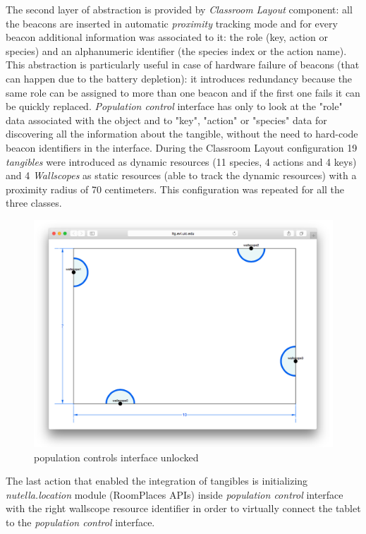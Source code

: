 The second layer of abstraction is provided by \textit{Classroom Layout} component: all the beacons are inserted in automatic \textit{proximity} tracking mode and for every beacon additional information was associated to it: the role (key, action or species) and an alphanumeric identifier (the species index or the action name). This abstraction is particularly useful in case of hardware failure of beacons (that can happen due to the battery depletion): it introduces redundancy because the same role can be assigned to more than one beacon and if the first one fails it can be quickly replaced. \textit{Population control} interface has only to look at the "role" data associated with the object and to "key", "action" or "species" data for discovering all the information about the tangible, without the need to hard-code beacon identifiers in the interface. During the Classroom Layout configuration 19 \textit{tangibles} were introduced as dynamic resources (11 species, 4 actions and 4 keys) and 4 \textit{Wallscopes} as static resources (able to track the dynamic resources) with a proximity radius of 70 centimeters. This configuration was repeated for all the three classes.

\begin{figure}
\centering
\includegraphics[width=4.5in]{images/wallcology-classroom-layout.png}
\caption{population controls interface unlocked}
\label{fig:wallcology_classroom_layout}
\end{figure}

The last action that enabled the integration of tangibles is initializing \textit{nutella.location} module (RoomPlaces APIs) inside \textit{population control} interface with the right wallscope resource identifier in order to virtually connect the tablet to the \textit{population control} interface.

